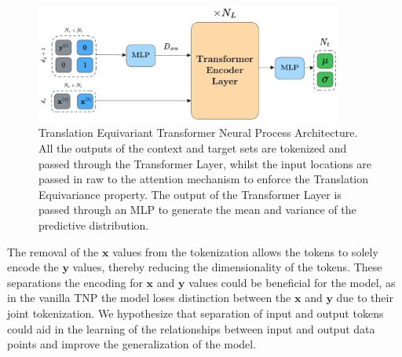 \documentclass[../../main.tex]{subfiles}
\begin{document}
\begin{figure}[H]
	\centering
	\includegraphics[width=0.9\textwidth]{./tetnp.png}
	\caption{Translation Equivariant Transformer Neural Process Architecture. All the outputs of the context and target sets are tokenized and passed through the Transformer Layer, whilst the input locations are passed in raw to the attention mechanism to enforce the Translation Equivariance property. The output of the Transformer Layer is passed through an MLP to generate the mean and variance of the predictive distribution.}
	\label{fig:tetnp}
\end{figure}


The removal of the $\bm{x}$ values from the tokenization allows the tokens to solely encode the $\bm{y}$ values, thereby reducing the dimensionality of the tokens. These separations the encoding for $\bm{x}$ and $\bm{y}$ values could be beneficial for the model, as in the vanilla TNP the model loses distinction between the $\bm{x}$ and $\bm{y}$ due to their joint tokenization. We hypothesize that separation of input and output tokens could aid in the learning of the relationships between input and output data points and improve the generalization of the model.









\end{document}
